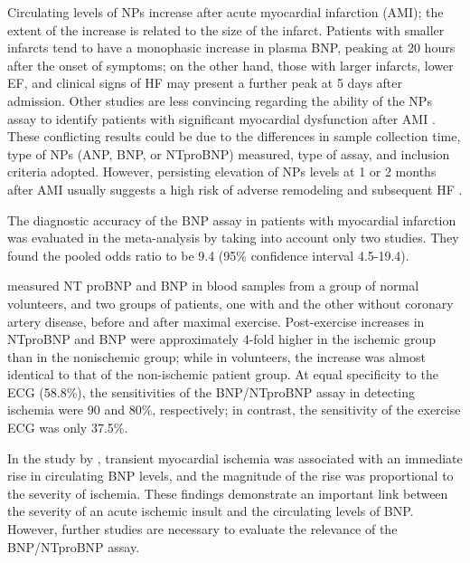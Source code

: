 \documentclass[14pt,a4paper,onecolumn]{extarticle}
\begin{document}
Circulating levels of NPs increase after acute myocardial infarction (AMI); the extent of the increase is related to the size of the infarct. Patients with smaller infarcts tend to have a monophasic increase in plasma BNP, peaking at 20 hours after the onset of symptoms; on the other hand, those with larger infarcts, lower EF, and clinical signs of HF may present a further peak at 5 days after admission. Other studies are less convincing regarding the ability of the NPs assay to identify patients with significant myocardial dysfunction after AMI \citep{bib3139}. These conflicting results could be due to the differences in sample collection time, type of NPs (ANP, BNP, or NTproBNP) measured, type of assay, and inclusion criteria adopted. However, persisting elevation of NPs levels at 1 or 2 months after AMI usually suggests a high risk of adverse remodeling and subsequent HF \citep{bib35}.

The diagnostic accuracy of the BNP assay in patients with myocardial infarction was evaluated in the meta-analysis by \citep{bib372} taking into account only two studies.%
They found the pooled odds ratio to be 9.4 (95\% confidence interval 4.5-19.4).


\citep{bib3163} measured NT proBNP and BNP in blood samples from a group of normal volunteers, and two groups of patients, one with and the other without coronary artery disease, before and after maximal exercise. Post-exercise increases in NTproBNP and BNP were approximately 4-fold higher in the ischemic group than in the nonischemic group; while in volunteers, the increase was almost identical to that of the non-ischemic patient group. At equal specificity to the ECG (58.8\%), the sensitivities of the BNP/NTproBNP assay in detecting ischemia were 90 and 80\%, respectively; in contrast, the sensitivity of the exercise ECG was only 37.5\%.

In the study by \citep{bib3164}, transient myocardial ischemia was associated with an immediate rise in circulating BNP levels, and the magnitude of the rise was proportional to the severity of ischemia. These findings demonstrate an important link between the severity of an acute ischemic insult and the circulating levels of BNP. However, further studies are necessary to evaluate the relevance of the BNP/NTproBNP assay.
\end{document}
